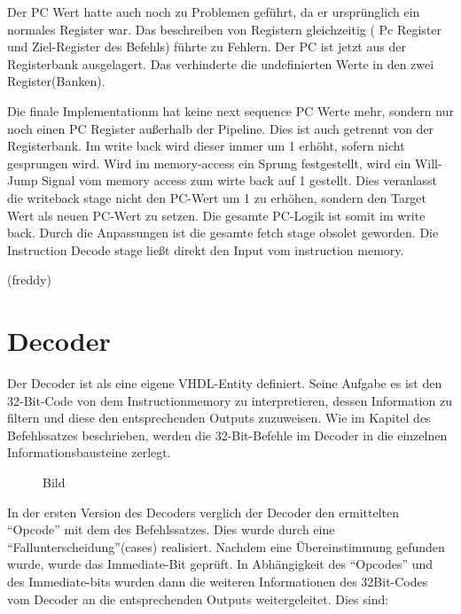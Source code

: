\documentclass[paper=a4,fontsize=12pt,twocolumn]{scrreprt}
\begin{document}
Der PC Wert hatte auch noch zu Problemen geführt, da er ursprünglich ein normales Register war. Das beschreiben von Registern gleichzeitig ( Pc Register und Ziel-Register des Befehls) führte zu Fehlern.
Der PC ist jetzt aus der Registerbank ausgelagert.
Das verhinderte die undefinierten Werte in den zwei Register(Banken).

Die finale Implementationm hat keine next sequence PC Werte mehr, sondern nur noch einen PC Register außerhalb der Pipeline.
Dies ist auch getrennt von der Registerbank.
Im write back wird dieser immer um 1 erhöht, sofern nicht gesprungen wird.
Wird im memory-access ein Sprung festgestellt, wird ein Will-Jump Signal vom memory access zum wirte back auf 1 gestellt. Dies veranlasst die writeback stage nicht den PC-Wert um 1 zu erhöhen, sondern den Target Wert als neuen PC-Wert zu setzen. 
Die gesamte PC-Logik ist somit im write back.
Durch die Anpassungen ist die gesamte fetch stage obsolet geworden. Die  Instruction Decode stage ließt direkt den Input vom instruction memory. 

(freddy)

\section{Decoder}

Der Decoder ist als eine eigene VHDL-Entity definiert. Seine Aufgabe es ist den 32-Bit-Code von dem Instructionmemory zu interpretieren, dessen Information zu filtern und diese den entsprechenden Outputs zuzuweisen.
Wie im Kapitel des Befehlssatzes beschrieben, werden die 32-Bit-Befehle im Decoder in die einzelnen Informationsbausteine zerlegt.

\begin{figure}[h]
\centering
\caption{Bild}
\end{figure}

In der ersten Version des Decoders verglich der Decoder den ermittelten \enquote{Opcode} mit dem des Befehlssatzes.
Dies wurde durch eine \enquote{Fallunterscheidung}(cases) realisiert. Nachdem eine Übereinstimmung gefunden wurde, wurde das Immediate-Bit geprüft.
In Abhängigkeit des \enquote{Opcodes} und des Immediate-bits wurden dann die weiteren Informationen des 32Bit-Codes vom Decoder an die entsprechenden Outputs weitergeleitet. 
Dies sind:
\end{document}

